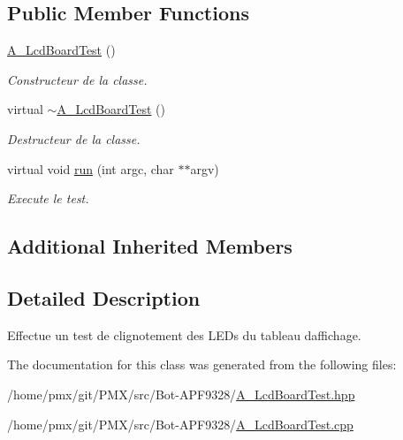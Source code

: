 \subsection*{Public Member Functions}
\begin{DoxyCompactItemize}
\item 
\mbox{\label{classA__LcdBoardTest_acc6b1652d9ca465b8f4894e06878c6ce}} 
\hyperlink{classA__LcdBoardTest_acc6b1652d9ca465b8f4894e06878c6ce}{A\+\_\+\+Lcd\+Board\+Test} ()
\begin{DoxyCompactList}\small\item\em Constructeur de la classe. \end{DoxyCompactList}\item 
\mbox{\label{classA__LcdBoardTest_a2697dd45bbfd98e1269b5da5e8112849}} 
virtual \hyperlink{classA__LcdBoardTest_a2697dd45bbfd98e1269b5da5e8112849}{$\sim$\+A\+\_\+\+Lcd\+Board\+Test} ()
\begin{DoxyCompactList}\small\item\em Destructeur de la classe. \end{DoxyCompactList}\item 
\mbox{\label{classA__LcdBoardTest_ae41885fb9b4623bb4897e264b1550054}} 
virtual void \hyperlink{classA__LcdBoardTest_ae41885fb9b4623bb4897e264b1550054}{run} (int argc, char $\ast$$\ast$argv)
\begin{DoxyCompactList}\small\item\em Execute le test. \end{DoxyCompactList}\end{DoxyCompactItemize}
\subsection*{Additional Inherited Members}


\subsection{Detailed Description}
Effectue un test de clignotement des L\+E\+Ds du tableau d\textquotesingle{}affichage. 

The documentation for this class was generated from the following files\+:\begin{DoxyCompactItemize}
\item 
/home/pmx/git/\+P\+M\+X/src/\+Bot-\/\+A\+P\+F9328/\hyperlink{A__LcdBoardTest_8hpp}{A\+\_\+\+Lcd\+Board\+Test.\+hpp}\item 
/home/pmx/git/\+P\+M\+X/src/\+Bot-\/\+A\+P\+F9328/\hyperlink{A__LcdBoardTest_8cpp}{A\+\_\+\+Lcd\+Board\+Test.\+cpp}\end{DoxyCompactItemize}
